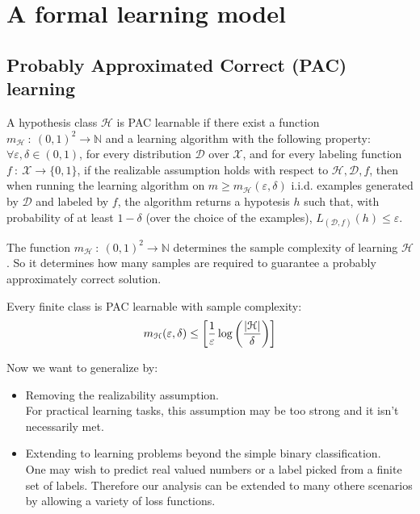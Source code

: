 \documentclass[../../main/main.tex]{subfiles}
\begin{document}
\chapter{A formal learning model}

\section{Probably Approximated Correct (PAC) learning}

\begin{definition}
    A hypothesis class \( \mathcal{H} \) is PAC learnable if there exist a function \( m_{\mathcal{H}} \ : \ (0,1)^2 \to \mathbb{N} \) and a learning algorithm with the following property:
    \( \forall \varepsilon, \delta \in (0,1) \), for every distribution \( \mathcal{D} \) over \( \mathcal{X} \),
    and for every labeling function \( f \ : \ \mathcal{X} \to \{ 0,1 \} \), if the realizable assumption holds with respect to \( \mathcal{H}, \mathcal{D}, f \),
    then when running the learning algorithm on \( m \ge m_{\mathcal{H}}(\varepsilon, \delta) \) i.i.d. examples generated by \( \mathcal{D} \) and labeled by \( f \),
    the algorithm returns a hypotesis \( h \) such that, with probability of at least \( 1 - \delta \) (over the choice of the examples), \( L_{(\mathcal{D},f)}(h) \le \varepsilon \).
\end{definition}

The function \( m_{\mathcal{H}} \ : \ (0,1)^2 \to \mathbb{N} \) determines the sample complexity of learning \( \mathcal{H} \).
So it determines how many samples are required to guarantee a probably approximately correct solution.

\begin{corollary}[]
    Every finite class is PAC learnable with sample complexity:
    \begin{equation}
        m_{\mathcal{H}}(\varepsilon, \delta)
        \le
        \left[
        \frac{1}{\varepsilon} \log{\left( \frac{\abs{\mathcal{H}}}{\delta} \right)}
        \right]
        \label{eq:C2_PAC}
    \end{equation}
\end{corollary}

Now we want to generalize by:
\begin{itemize}
    \item Removing the realizability assumption.\\
        For practical learning tasks, this assumption may be too strong and it isn't necessarily met.
    \item Extending to learning problems beyond the simple binary classification.\\
        One may wish to predict real valued numbers or a label picked from a finite set of labels. Therefore our analysis can be extended to many othere scenarios by allowing a variety of loss functions.
\end{itemize}
\end{document}
